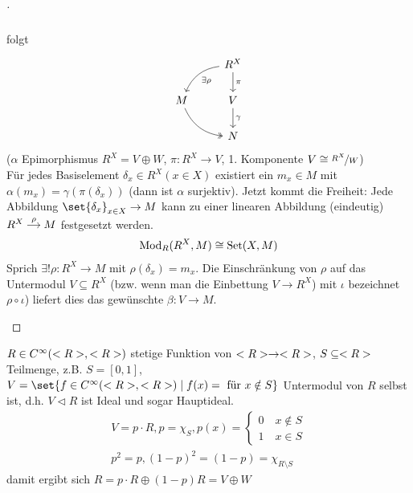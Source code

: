 \begin{proof}[]
\begin{enumerate}
\[\begin{tikzcd}[ampersand replacement=\&]
			\end{tikzcd}
		\]
		folgt
		\[
			\begin{tikzcd}[ampersand replacement=\&]
			\& R^X \arrow[ld, "\exists \rho", bend right] \arrow[d, "\pi"] \\
			M \arrow[rd, two heads, bend right] \& V \arrow[d, "\gamma"]                                       \\
			\& N                                                          
			\end{tikzcd}
		\]
		($\alpha$ Epimorphismus $R^X = V \oplus W$, $\pi \colon R^X \to V$, 1. Komponente $V \cong \lnkset{R^X}{W}$)\\
		Für jedes Basiselement $\delta_x \in R^X (x \in X)$ existiert ein $m_x \in M$ mit $\alpha(m_x) = \gamma(\pi(\delta_x))$ (dann ist $\alpha$ surjektiv). Jetzt kommt die Freiheit: Jede Abbildung $\set{\delta_x}_{x \in X} \to M$ kann zu einer linearen Abbildung (eindeutig) $\begin{tikzcd}[cramped, sep=small]
		R^X \arrow[r, "\rho"] & M
		\end{tikzcd}$ festgesetzt werden.
		\begin{align*}
			\operatorname{Mod}_R(R^X, M) \cong \operatorname{Set}(X,M)
		\end{align*}
		Sprich $\exists! \rho \colon R^X \to M$ mit $\rho(\delta_x) = m_x$. Die Einschränkung von $\rho$ auf das Untermodul $V \subseteq R^X$ (bzw. wenn man die Einbettung $V \to R^X$) mit $\iota$ bezeichnet $\rho \circ \iota$)  liefert dies das gewünschte $\beta\colon V \to M$.
	\end{enumerate}
\end{proof}
\begin{example}
	$R \in C^{\infty}(<R>, <R>)$ stetige Funktion von $<R> \to <R>$, $S \subseteq <R>$ Teilmenge, z.B. $S = [0,1]$,\\ $V = \set{f \in C^{\infty}(\R, \R) \mid f(x) = \text{ für }x \notin S}$ Untermodul von $R$ selbst ist, d.h. $V \lhd R$ ist Ideal und sogar Hauptideal.
	\begin{align*}
		V = p \cdot R, p = \chi_S, p(x) = \begin{cases}
		0 \quad x \notin S\\
		1 \quad x \in S
		\end{cases}\\
		p^2 = p, (1-p)^2 = (1-p) = \chi_{R \setminus S}
	\end{align*}
	damit ergibt sich $R = p \cdot R \oplus (1-p)R = V \oplus W$ 
\end{example}
